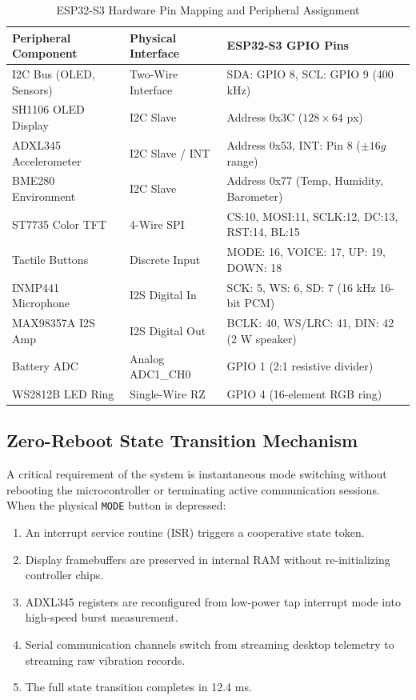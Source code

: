 \documentclass[10pt,journal,onecolumn]{IEEEtran}
\begin{document}
\begin{table}[htbp]
\caption{ESP32-S3 Hardware Pin Mapping and Peripheral Assignment}
\begin{center}
\begin{tabular}{lll}
\toprule
\textbf{Peripheral Component} & \textbf{Physical Interface} & \textbf{ESP32-S3 GPIO Pins} \\
\midrule
I2C Bus (OLED, Sensors) & Two-Wire Interface & SDA: GPIO 8, SCL: GPIO 9 (400 kHz) \\
SH1106 OLED Display & I2C Slave & Address 0x3C ($128 \times 64$ px) \\
ADXL345 Accelerometer & I2C Slave / INT & Address 0x53, INT: Pin 8 ($\pm 16g$ range) \\
BME280 Environment & I2C Slave & Address 0x77 (Temp, Humidity, Barometer) \\
ST7735 Color TFT & 4-Wire SPI & CS:10, MOSI:11, SCLK:12, DC:13, RST:14, BL:15 \\
Tactile Buttons & Discrete Input & MODE: 16, VOICE: 17, UP: 19, DOWN: 18 \\
INMP441 Microphone & I2S Digital In & SCK: 5, WS: 6, SD: 7 (16 kHz 16-bit PCM) \\
MAX98357A I2S Amp & I2S Digital Out & BCLK: 40, WS/LRC: 41, DIN: 42 (2 W speaker) \\
Battery ADC & Analog ADC1\_CH0 & GPIO 1 (2:1 resistive divider) \\
WS2812B LED Ring & Single-Wire RZ & GPIO 4 (16-element RGB ring) \\
\bottomrule
\end{tabular}
\end{center}
\label{tab:pins}
\end{table}

\subsection{Zero-Reboot State Transition Mechanism}
A critical requirement of the system is instantaneous mode switching without rebooting the microcontroller or terminating active communication sessions. When the physical \texttt{MODE} button is depressed:
\begin{enumerate}
    \item An interrupt service routine (ISR) triggers a cooperative state token.
    \item Display framebuffers are preserved in internal RAM without re-initializing controller chips.
    \item ADXL345 registers are reconfigured from low-power tap interrupt mode into high-speed burst measurement.
    \item Serial communication channels switch from streaming desktop telemetry to streaming raw vibration records.
    \item The full state transition completes in 12.4 ms.
\end{enumerate}
\end{document}

